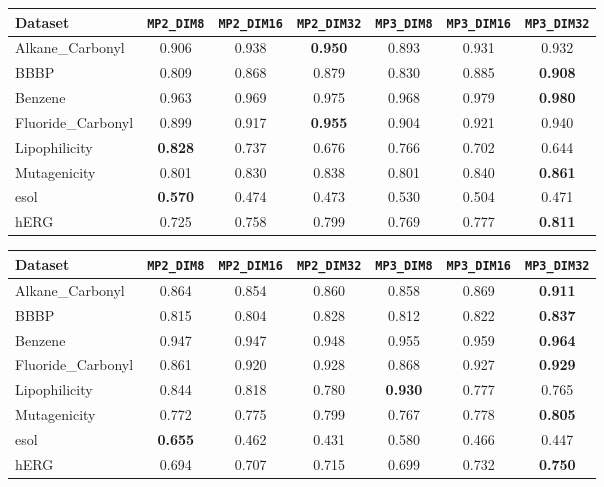 \begin{tabular}{lcccccc}
\hline
Dataset & \texttt{MP2\_DIM8} & \texttt{MP2\_DIM16} & \texttt{MP2\_DIM32} & \texttt{MP3\_DIM8} & \texttt{MP3\_DIM16} & \texttt{MP3\_DIM32} \\ \hline
Alkane_Carbonyl & 0.906 & 0.938 & \textbf{0.950} & 0.893 & 0.931 & 0.932 \\
BBBP & 0.809 & 0.868 & 0.879 & 0.830 & 0.885 & \textbf{0.908} \\
Benzene & 0.963 & 0.969 & 0.975 & 0.968 & 0.979 & \textbf{0.980} \\
Fluoride_Carbonyl & 0.899 & 0.917 & \textbf{0.955} & 0.904 & 0.921 & 0.940 \\
Lipophilicity & \textbf{0.828} & 0.737 & 0.676 & 0.766 & 0.702 & 0.644 \\
Mutagenicity & 0.801 & 0.830 & 0.838 & 0.801 & 0.840 & \textbf{0.861} \\
esol & \textbf{0.570} & 0.474 & 0.473 & 0.530 & 0.504 & 0.471 \\
hERG & 0.725 & 0.758 & 0.799 & 0.769 & 0.777 & \textbf{0.811} \\
\hline
\end{tabular}


\begin{tabular}{lcccccc}
\hline
Dataset & \texttt{MP2\_DIM8} & \texttt{MP2\_DIM16} & \texttt{MP2\_DIM32} & \texttt{MP3\_DIM8} & \texttt{MP3\_DIM16} & \texttt{MP3\_DIM32} \\ \hline
Alkane_Carbonyl & 0.864 & 0.854 & 0.860 & 0.858 & 0.869 & \textbf{0.911} \\
BBBP & 0.815 & 0.804 & 0.828 & 0.812 & 0.822 & \textbf{0.837} \\
Benzene & 0.947 & 0.947 & 0.948 & 0.955 & 0.959 & \textbf{0.964} \\
Fluoride_Carbonyl & 0.861 & 0.920 & 0.928 & 0.868 & 0.927 & \textbf{0.929} \\
Lipophilicity & 0.844 & 0.818 & 0.780 & \textbf{0.930} & 0.777 & 0.765 \\
Mutagenicity & 0.772 & 0.775 & 0.799 & 0.767 & 0.778 & \textbf{0.805} \\
esol & \textbf{0.655} & 0.462 & 0.431 & 0.580 & 0.466 & 0.447 \\
hERG & 0.694 & 0.707 & 0.715 & 0.699 & 0.732 & \textbf{0.750} \\
\hline
\end{tabular}

